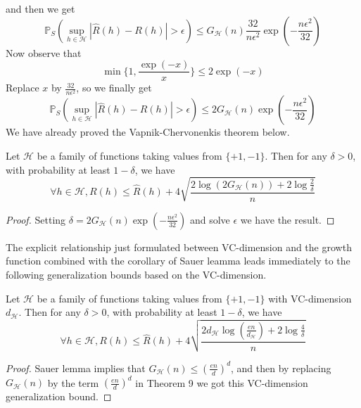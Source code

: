 and then we get
\begin{equation}
\mathbb{P}_S \left(\sup_{h \in \mathcal{H}}|\hat{R}(h)-R(h)|>\epsilon \right) \leq G_{\mathcal{H}}(n) \frac{32}{n\epsilon^2} \exp\left(-\frac{n\epsilon^2}{32} \right)
\end{equation}
Now observe that
\begin{equation}
\min\{1,\frac{\exp(-x)}{x}\} \leq 2\exp(-x)
\end{equation}
Replace $x$ by $\frac{32}{n\epsilon^2}$, so we finally get 
\begin{equation}
\mathbb{P}_S \left(\sup_{h \in \mathcal{H}}|\hat{R}(h)-R(h)|>\epsilon \right) \leq 2G_{\mathcal{H}}(n) \exp\left(-\frac{n\epsilon^2}{32} \right)
\end{equation}
We have already proved the Vapnik-Chervonenkis theorem below.
\begin{theorem}
	Let $\mathcal{H}$ be a family of functions taking values from $\{+1, -1\}$. Then for any $\delta>0$, with probability at least $1-\delta$, we have
	\begin{equation}
	\forall h \in \mathcal{H}, R(h) \leq \hat{R}(h)+ 4\sqrt{\frac{2\log(2G_{\mathcal{H}}(n))+2\log\frac{2}{\delta}}{n}}
	\end{equation}
\end{theorem}
\begin{proof}
	Setting $\delta = 2G_{\mathcal{H}}(n) \exp\left(-\frac{n\epsilon^2}{32} \right)$ and solve $\epsilon$ we have the result.
\end{proof}
The explicit relationship just formulated between VC-dimension and the growth
function combined with the corollary of Sauer leamma leads immediately to the following generalization bounds based on the VC-dimension.
\begin{corollary}
	Let $\mathcal{H}$ be a family of functions taking values from $\{+1, -1\}$ with VC-dimension $d_{\mathcal{H}}$. Then for any $\delta>0$, with probability at least $1-\delta$, we have
	\begin{equation}
	\forall h \in \mathcal{H}, R(h) \leq \hat{R}(h)+ 4\sqrt{\frac{2d_{\mathcal{H}}\log(\frac{en}{d_{\mathcal{H}}})+2\log\frac{4}{\delta}}{n}}
	\end{equation}
\end{corollary}
\begin{proof}
	Sauer lemma implies that $	G_\mathcal{H}(n) \leq \left(\frac{en}{d} \right) ^d$, and then by replacing $G_\mathcal{H}(n)$ by the term $\left(\frac{en}{d}\right) ^d$ in Theorem 9 we got this VC-dimension generalization bound. 
\end{proof}
